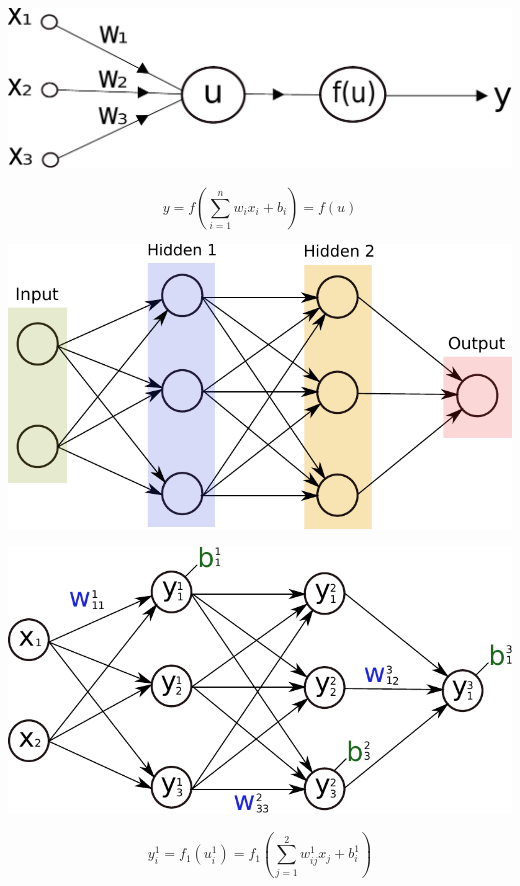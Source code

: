 \documentclass{beamer}
\begin{document}
\begin{frame}

\centering
\includegraphics[width=0.8\linewidth]{../Figures/Theory/neuron.pdf} 

\begin{equation*}
 y = f\left(\sum_{i=1}^n w_ix_i + b_i\right) = f(u)
\end{equation*}
 
\end{frame}


\begin{frame}
 
\centering
\includegraphics[width=0.9\linewidth]{../Figures/Theory/networkGeneralAltered.pdf}

\end{frame}


\begin{frame}
 
\centering
\includegraphics[width=0.8\linewidth]{../Figures/Theory/networkWithNotationAltered.pdf}

\begin{equation*}
 y_i^1 = f_1(u_i^1) = f_1\left(\sum_{j=1}^2 w_{ij}^1 x_j  + b_i^1\right)
\end{equation*}

\end{frame}
\end{document}
